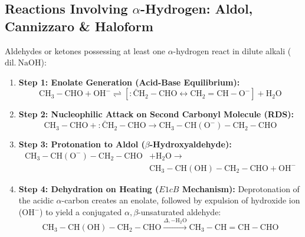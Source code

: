 \documentclass[10pt,twoside,openright]{book}
\begin{document}
\subsection{Reactions Involving \texorpdfstring{$\alpha$}{alpha}-Hydrogen: Aldol, Cannizzaro \& Haloform}

\begin{formulabox}
Aldehydes or ketones possessing at least one $\alpha$-hydrogen react in dilute alkali ($\mathrm{dil.\ NaOH}$):
\begin{enumerate}[leftmargin=*]
  \item \textbf{Step 1: Enolate Generation (Acid-Base Equilibrium):}
  \begin{equation}
    \mathrm{CH_3-CHO} + \mathrm{OH^-} \rightleftharpoons [\mathrm{:\bar{C}H_2-CHO} \longleftrightarrow \mathrm{CH_2=CH-O^-}] + \mathrm{H_2O}
  \end{equation}
  \item \textbf{Step 2: Nucleophilic Attack on Second Carbonyl Molecule (RDS):}
  \begin{equation}
    \mathrm{CH_3-CHO} + \mathrm{:\bar{C}H_2-CHO} \longrightarrow \mathrm{CH_3-CH(O^-)-CH_2-CHO}
  \end{equation}
  \item \textbf{Step 3: Protonation to Aldol ($\beta$-Hydroxyaldehyde):}
  \begin{align}
    \mathrm{CH_3-CH(O^-)-CH_2-CHO} &+ \mathrm{H_2O} \longrightarrow \\
    &\mathbf{\mathrm{CH_3-CH(OH)-CH_2-CHO}} + \mathrm{OH^-}
  \end{align}
  \item \textbf{Step 4: Dehydration on Heating ($E1cB$ Mechanism):}
  Deprotonation of the acidic $\alpha$-carbon creates an enolate, followed by expulsion of hydroxide ion ($\mathrm{OH^-}$) to yield a conjugated $\alpha,\beta$-unsaturated aldehyde:
  \begin{equation}
    \mathrm{CH_3-CH(OH)-CH_2-CHO} \xrightarrow{\Delta, -\mathrm{H_2O}} \mathbf{\mathrm{CH_3-CH=CH-CHO}}
  \end{equation}
\end{enumerate}
\end{formulabox}
\end{document}
